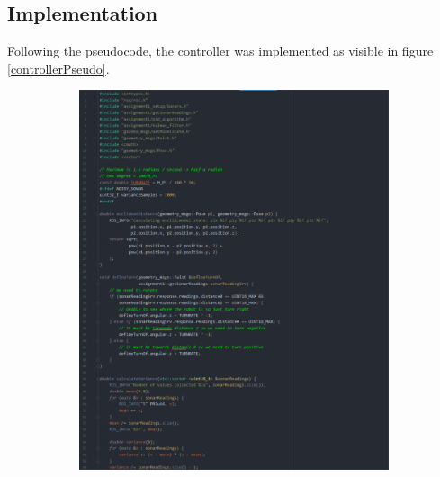 \documentclass{article}
\begin{document}
\subsection{Implementation}
Following the pseudocode, the controller was implemented as visible in figure
\ref{controllerPseudo}. 
\begin{figure}[ht]
    \begin{subfigure}{.5\textwidth}
        \centering
        \includegraphics[scale=0.24]{img/controller1.png}
    \end{subfigure}
    \begin{subfigure}{.5\textwidth}
        \centering

\end{subfigure}
\end{figure}
\end{document}
